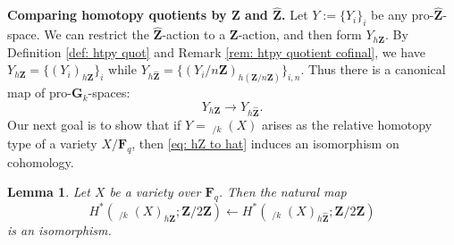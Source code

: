 \documentclass[10pt, reqno]{amsart}
\numberwithin{equation}{subsection}
\newcommand{\F}{\mathbf{F}}
\newcommand{\G}{\mathbf{G}}
\newcommand{\Z}{\mathbf{Z}}
\newcommand{\wh}[1]{\widehat{#1}}
\DeclareMathOperator{\Et}{\acute{E}t}
\newtheorem{lemma}[thm]{Lemma}
\theoremstyle{remark}
\begin{document}
\noindent \textbf{Comparing homotopy quotients by $\Z$ and $\wh{\Z}$.} Let $Y := \{Y_i\}_i$ be any pro-$\wh{\Z}$-space. We can restrict the $\wh{\Z}$-action to a $\Z$-action, and then form $Y_{h\Z}$. By Definition \ref{def: htpy quot} and Remark \ref{rem: htpy quotient cofinal}, we have $Y_{h\Z} = \{(Y_i)_{h\Z}\}_i$ while  $Y_{h\wh{\Z}} =\{(Y_i/n\Z)_{h(\Z/n\Z)}\}_{i,n}$. Thus there is a canonical map of pro-$\G_k$-spaces:
\begin{equation}\label{eq: hZ to hat}
Y_{h\Z} \rightarrow Y_{h\wh{\Z}}.
\end{equation}
Our next goal is to show that if $Y = \Et_{/k}(X)$ arises as the relative homotopy type of a variety $X/\F_q$, then \eqref{eq: hZ to hat} induces an isomorphism on cohomology. 

\begin{lemma}\label{battle Z vs Z/n} 
Let $X$ be a variety over $\F_q$. Then the natural map
\[
 H^*( \Et_{/k}(X)_{h\Z}; \Z/2\Z)  \leftarrow  H^*( \Et_{/k}(X)_{h\wh{\Z}}; \Z/2\Z)
\]
is an isomorphism.
\end{lemma}
\end{document}
